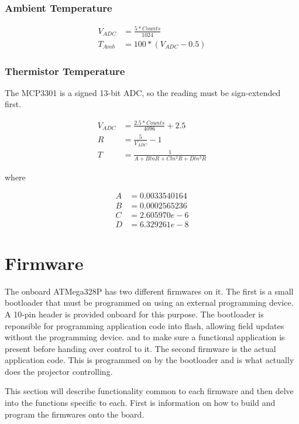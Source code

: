 \documentclass{article}
\begin{document}
\subsubsection{Ambient Temperature}
\begin{align*}
    V_{ADC} &= \frac{5 * Counts}{1024} \\
    T_{Amb} &= 100 * (V_{ADC} - 0.5)
\end{align*}

\subsubsection{Thermistor Temperature}
The MCP3301 is a signed 13-bit ADC, so the reading must be sign-extended first.

\begin{align*}
    V_{ADC} &= \frac{2.5 * Counts}{4096} + 2.5 \\
    R &= \frac{5}{V_{ADC}} - 1 \\
    T &= \frac{1}{A + BlnR + Cln^2R + Dln^3R}
\end{align*}

where

\begin{align*}
    A &= 0.0033540164 \\
    B &= 0.0002565236 \\
    C &= 2.605970e-6 \\
    D &= 6.329261e-8
\end{align*}


\section{Firmware} \label{sec:Firmware}
The onboard ATMega328P has two different firmwares on it.  The first is a small bootloader that must
be programmed on using an external programming device.  A 10-pin header is provided onboard for this
purpose.  The bootloader is reponsible for programming application code into flash, allowing field
updates without the programming device. and to make sure a functional application is present before
handing over control to it.  The second firmware is the actual application code.  This is programmed
on by the bootloader and is what actually does the projector controlling.

This section will describe functionality common to each firmware and then delve into the functions
specific to each.  First is information on how to build and program the firmwares onto the board.
\end{document}
